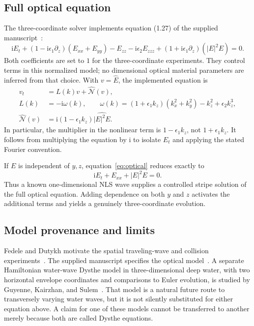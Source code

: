 \documentclass[10pt,letterpaper]{article}
\numberwithin{equation}{section}
\newcommand{\ii}{\mathrm{i}}
\begin{document}
\subsection{Full optical equation}
The three-coordinate solver implements equation (1.27) of the supplied manuscript~\cite{MPS26}:
\begin{equation}\label{eq:optical}
 \ii E_t+(1-\ii\epsilon_1\partial_z)(E_{xx}+E_{yy})
 -E_{zz}-\ii\epsilon_2 E_{zzz}
 +(1+\ii\epsilon_1\partial_z)(|E|^2E)=0.
\end{equation}
Both coefficients are set to $1$ for the three-coordinate experiments. They control terms in this normalized model; no dimensional optical material parameters are inferred from that choice. With $v=\widehat E$, the implemented equation is
\begin{align}
 v_t&=L(k)v+\widehat{\mathcal N}(v),\\
 L(k)&=-\ii\omega(k),\qquad
 \omega(k)=(1+\epsilon_1k_z)(k_x^2+k_y^2)-k_z^2+\epsilon_2k_z^3,
 \label{eq:symbol}\\
 \widehat{\mathcal N}(v)&=\ii(1-\epsilon_1k_z)\widehat{|E|^2E}.
 \label{eq:opticalnl}
\end{align}
In particular, the multiplier in the nonlinear term is $1-\epsilon_1k_z$, not $1+\epsilon_1k_z$. It follows from multiplying the equation by $\ii$ to isolate $E_t$ and applying the stated Fourier convention.

If $E$ is independent of $y,z$, equation~\eqref{eq:optical} reduces exactly to
\begin{equation}\label{eq:nls}
 \ii E_t+E_{xx}+|E|^2E=0.
\end{equation}
Thus a known one-dimensional NLS wave supplies a controlled stripe solution of the full optical equation. Adding dependence on both $y$ and $z$ activates the additional terms and yields a genuinely three-coordinate evolution.

\subsection{Model provenance and limits}
Fedele and Dutykh motivate the spatial traveling-wave and collision experiments~\cite{FD}. The supplied manuscript specifies the optical model~\cite{MPS26}. A separate Hamiltonian water-wave Dysthe model in three-dimensional deep water, with two horizontal envelope coordinates and comparisons to Euler evolution, is studied by Guyenne, Kairzhan, and Sulem~\cite{GKS}. That model is a natural future route to transversely varying water waves, but it is not silently substituted for either equation above. A claim for one of these models cannot be transferred to another merely because both are called Dysthe equations.
\end{document}
